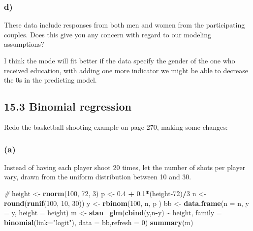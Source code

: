 \documentclass[
]{article}
\newenvironment{Shaded}{\begin{snugshade}}{\end{snugshade}}
\newcommand{\AttributeTok}[1]{\textcolor[rgb]{0.13,0.29,0.53}{#1}}
\newcommand{\CommentTok}[1]{\textcolor[rgb]{0.56,0.35,0.01}{\textit{#1}}}
\newcommand{\DecValTok}[1]{\textcolor[rgb]{0.00,0.00,0.81}{#1}}
\newcommand{\FloatTok}[1]{\textcolor[rgb]{0.00,0.00,0.81}{#1}}
\newcommand{\FunctionTok}[1]{\textcolor[rgb]{0.13,0.29,0.53}{\textbf{#1}}}
\newcommand{\NormalTok}[1]{#1}
\newcommand{\OtherTok}[1]{\textcolor[rgb]{0.56,0.35,0.01}{#1}}
\newcommand{\SpecialCharTok}[1]{\textcolor[rgb]{0.81,0.36,0.00}{\textbf{#1}}}
\newcommand{\StringTok}[1]{\textcolor[rgb]{0.31,0.60,0.02}{#1}}
\begin{document}
\hypertarget{d}{%
\subsubsection{d)}\label{d}}

These data include responses from both men and women from the
participating couples. Does this give you any concern with regard to our
modeling assumptions?

I think the mode will fit better if the data specify the gender of the
one who received education, with adding one more indicator we might be
able to decrease the 0s in the predicting model.

\hypertarget{binomial-regression}{%
\subsection{15.3 Binomial regression}\label{binomial-regression}}

Redo the basketball shooting example on page 270, making some changes:

\hypertarget{a-1}{%
\subsubsection{(a)}\label{a-1}}

Instead of having each player shoot 20 times, let the number of shots
per player vary, drawn from the uniform distribution between 10 and 30.

\begin{Shaded}
\begin{Highlighting}[]
\CommentTok{\#}
\NormalTok{height }\OtherTok{\textless{}{-}} \FunctionTok{rnorm}\NormalTok{(}\DecValTok{100}\NormalTok{, }\DecValTok{72}\NormalTok{, }\DecValTok{3}\NormalTok{)}
\NormalTok{p }\OtherTok{\textless{}{-}} \FloatTok{0.4} \SpecialCharTok{+} \FloatTok{0.1}\SpecialCharTok{*}\NormalTok{(height}\DecValTok{{-}72}\NormalTok{)}\SpecialCharTok{/}\DecValTok{3}
\NormalTok{n }\OtherTok{\textless{}{-}} \FunctionTok{round}\NormalTok{(}\FunctionTok{runif}\NormalTok{(}\DecValTok{100}\NormalTok{, }\DecValTok{10}\NormalTok{, }\DecValTok{30}\NormalTok{))}
\NormalTok{y }\OtherTok{\textless{}{-}} \FunctionTok{rbinom}\NormalTok{(}\DecValTok{100}\NormalTok{, n, p )}
\NormalTok{bb }\OtherTok{\textless{}{-}} \FunctionTok{data.frame}\NormalTok{(}\AttributeTok{n =}\NormalTok{ n, }\AttributeTok{y =}\NormalTok{ y, }\AttributeTok{height =}\NormalTok{ height)}
\NormalTok{m }\OtherTok{\textless{}{-}} \FunctionTok{stan\_glm}\NormalTok{(}\FunctionTok{cbind}\NormalTok{(y,n}\SpecialCharTok{{-}}\NormalTok{y) }\SpecialCharTok{\textasciitilde{}}\NormalTok{ height, }\AttributeTok{family =} \FunctionTok{binomial}\NormalTok{(}\AttributeTok{link=}\StringTok{"logit"}\NormalTok{), }\AttributeTok{data =}\NormalTok{ bb,}\AttributeTok{refresh =} \DecValTok{0}\NormalTok{)}
\FunctionTok{summary}\NormalTok{(m)}
\end{Highlighting}
\end{Shaded}
\end{document}
